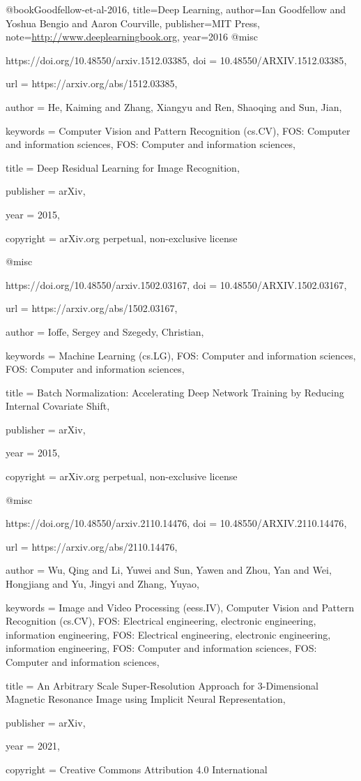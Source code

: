 @book{Goodfellow-et-al-2016,
    title={Deep Learning},
    author={Ian Goodfellow and Yoshua Bengio and Aaron Courville},
    publisher={MIT Press},
    note={\url{http://www.deeplearningbook.org}},
    year={2016}
}
@misc{https://doi.org/10.48550/arxiv.1512.03385,
  doi = {10.48550/ARXIV.1512.03385},
  
  url = {https://arxiv.org/abs/1512.03385},
  
  author = {He, Kaiming and Zhang, Xiangyu and Ren, Shaoqing and Sun, Jian},
  
  keywords = {Computer Vision and Pattern Recognition (cs.CV), FOS: Computer and information sciences, FOS: Computer and information sciences},
  
  title = {Deep Residual Learning for Image Recognition},
  
  publisher = {arXiv},
  
  year = {2015},
  
  copyright = {arXiv.org perpetual, non-exclusive license}
}

@misc{https://doi.org/10.48550/arxiv.1502.03167,
  doi = {10.48550/ARXIV.1502.03167},
  
  url = {https://arxiv.org/abs/1502.03167},
  
  author = {Ioffe, Sergey and Szegedy, Christian},
  
  keywords = {Machine Learning (cs.LG), FOS: Computer and information sciences, FOS: Computer and information sciences},
  
  title = {Batch Normalization: Accelerating Deep Network Training by Reducing Internal Covariate Shift},
  
  publisher = {arXiv},
  
  year = {2015},
  
  copyright = {arXiv.org perpetual, non-exclusive license}
}

@misc{https://doi.org/10.48550/arxiv.2110.14476,
  doi = {10.48550/ARXIV.2110.14476},
  
  url = {https://arxiv.org/abs/2110.14476},
  
  author = {Wu, Qing and Li, Yuwei and Sun, Yawen and Zhou, Yan and Wei, Hongjiang and Yu, Jingyi and Zhang, Yuyao},
  
  keywords = {Image and Video Processing (eess.IV), Computer Vision and Pattern Recognition (cs.CV), FOS: Electrical engineering, electronic engineering, information engineering, FOS: Electrical engineering, electronic engineering, information engineering, FOS: Computer and information sciences, FOS: Computer and information sciences},
  
  title = {An Arbitrary Scale Super-Resolution Approach for 3-Dimensional Magnetic Resonance Image using Implicit Neural Representation},
  
  publisher = {arXiv},
  
  year = {2021},
  
  copyright = {Creative Commons Attribution 4.0 International}
}


